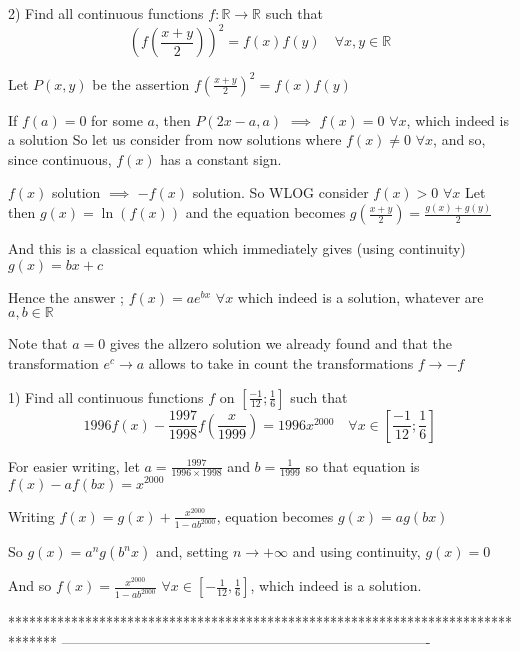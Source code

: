 \begin{solution}
	\begin{tcolorbox}2) Find all continuous functions $f:\mathbb{R}\to\mathbb{R}$  such that
\[\left ( f\left ( \frac{x+y}{2} \right ) \right )^{2}=f(x)f(y) \quad \forall x,y \in \mathbb{R}\]\end{tcolorbox}
Let $P(x,y)$ be the assertion $f(\frac {x+y}2)^2=f(x)f(y)$

If $f(a)=0$ for some $a$, then $P(2x-a,a)$ $\implies$ $f(x)=0$ $\forall x$, which indeed is a solution
So let us consider from now solutions where $f(x)\ne 0$ $\forall x$, and so, since continuous, $f(x)$ has a constant sign.

$f(x)$ solution $\implies$ $-f(x)$ solution. So WLOG consider $f(x)>0$ $\forall x$
Let then $g(x)=\ln (f(x))$ and the equation becomes $g(\frac {x+y}2)=\frac{g(x)+g(y)}2$

And this is a classical equation which immediately gives (using continuity) $g(x)=bx+c$

Hence the answer ; $\boxed{f(x)=a e^{bx}}$ $\forall x$ which indeed is a solution, whatever are $a,b\in\mathbb R$

Note that $a=0$ gives the allzero solution we already found and that the transformation $e^c\to a$ allows to take in count the transformations $f\to -f$
\end{solution}



\begin{solution}
	\begin{tcolorbox}1) Find all continuous functions $f$ on $\left [ \frac{-1}{12};\frac{1}{6} \right ]$ such that 
\[1996f(x)-\frac{1997}{1998}f\left ( \frac{x}{1999} \right )=1996x^{2000} \quad \forall x \in  \left [ \frac{-1}{12};\frac{1}{6} \right ]\]\end{tcolorbox}
For easier writing, let $a=\frac{1997}{1996\times 1998}$ and $b=\frac 1{1999}$ so that equation is $f(x)-af(bx)=x^{2000}$

Writing ${f(x)=g(x)+\frac{x^{2000}}{1-ab^{2000}}}$, equation becomes $g(x)=ag(bx)$

So $g(x)=a^ng(b^nx)$ and, setting $n\to+\infty$ and using continuity, $g(x)=0$

And so $\boxed{f(x)=\frac{x^{2000}}{1-ab^{2000}}}$ $\forall x\in[-\frac 1{12},\frac 16]$, which indeed is a solution.
\end{solution}
*******************************************************************************
-------------------------------------------------------------------------------

